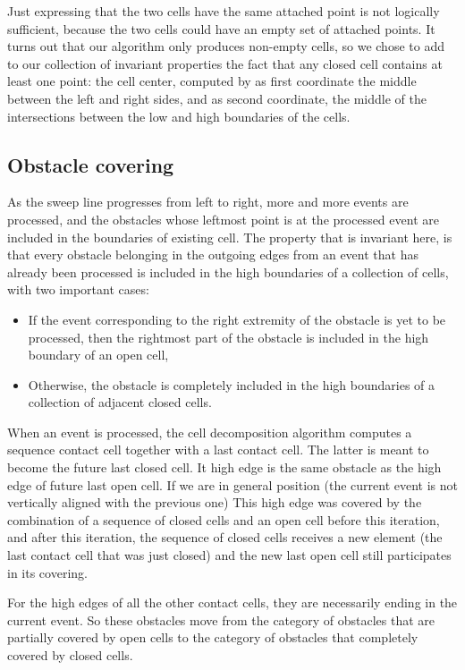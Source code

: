 \documentclass[a4paper, USenglish, cleveref, autoref, thm-restate]{lipics-v2021}
\begin{document}
\marginpar{\textcolor{blue}{not sure about this par, probably useful,
    but not the right place.}}
Just expressing that the two cells have the same attached point is not
logically sufficient, because the two cells could have an empty set of
attached points.  It turns out that our algorithm only produces
non-empty cells, so we chose to add to our collection of invariant
properties the fact that any closed cell contains at least one point:
the cell center, computed by as first coordinate the middle between
the left and right sides, and as second coordinate, the middle of the
intersections between the low and high boundaries of the cells.
\subsection{Obstacle covering}
As the sweep line progresses from left to right, more and more events
are processed, and the obstacles whose leftmost point is at the
processed event are included in the boundaries of existing cell.  The
property that is invariant here, is that every obstacle belonging in
the outgoing edges from an event that has already been processed is
included in the high boundaries of a collection of cells, with two
important cases:
\begin{itemize}
\item If the event corresponding to the right extremity of the
  obstacle is yet to be processed, then the rightmost part of the
  obstacle is included in the high boundary of an open cell,
\item Otherwise, the obstacle is completely included in the high
  boundaries of a collection of adjacent closed cells.
\end{itemize}

When an event is processed, the cell decomposition algorithm computes
a sequence contact cell together with a last contact cell.  The latter
is meant to become the future last closed cell.  It high edge is the
same obstacle as the high edge of future last open cell.  If we
are in general position (the current event is not vertically aligned
with the previous one) This high
edge was covered by the combination of a sequence of closed cells and
an open cell before this iteration, and after this iteration, the
sequence of closed cells receives a new element (the last contact cell
that was just closed) and the new last open cell still participates in
its covering.

For the high edges of all the other contact cells, they are
necessarily ending in the current event.  So these obstacles move from
the category of obstacles that are partially covered by open cells to
the category of obstacles that completely covered by closed cells.
\end{document}
